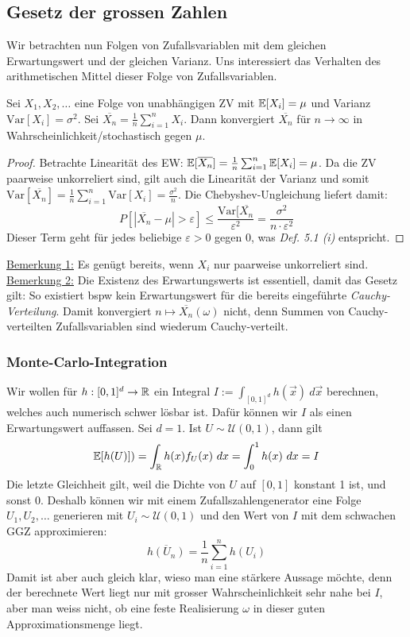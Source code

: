 \subsection{Gesetz der grossen Zahlen}
Wir betrachten nun Folgen von Zufallsvariablen mit dem gleichen Erwartungswert und der gleichen Varianz. Uns interessiert das Verhalten des arithmetischen Mittel dieser Folge von Zufallsvariablen.
\begin{satz}
Sei $X_1, X_2, \dots$ eine Folge von unabhängigen ZV mit $\mathbb{E}[X_i]= \mu $ und Varianz $\mathrm{Var}[X_i] = \sigma^2$. Sei $\overline{X_n} =\frac{1}{n}\sum_{i=1}^n X_i$. Dann konvergiert $\overline{X_n}$ für $n\to \infty$ in Wahrscheinlichkeit/stochastisch gegen $\mu$.
\end{satz}
\begin{proof}
Betrachte Linearität des EW: $\mathbb{E}[\overline{X_n}] = \frac{1}{n}\sum_{i=1}^n \mathbb{E}[X_i] = \mu$. Da die ZV paarweise unkorreliert sind, gilt auch die Linearität der Varianz und somit $\mathrm{Var}[\overline{X_n}] = \frac{1}{n}\sum_{i=1}^n \mathrm{Var}[X_i] = \frac{\sigma^2}{n}$. Die Chebyshev-Ungleichung liefert damit:
$$ P \left[ |\overline{X_n}-\mu|> \varepsilon \right] \leq \frac{\mathrm{Var}[\overline{X_n}}{\varepsilon^2} = \frac{\sigma^2}{n\cdot \varepsilon^2}$$
Dieser Term geht für jedes beliebige $\varepsilon>0$ gegen 0, was \textit{Def. 5.1 (i)} entspricht.
\end{proof}
\underline{Bemerkung 1:} Es genügt bereits, wenn $X_i$ nur paarweise unkorreliert sind.\\
\underline{Bemerkung 2:} Die Existenz des Erwartungswerts ist essentiell, damit das Gesetz gilt: So existiert bspw kein Erwartungswert für die bereits eingeführte \textit{Cauchy-Verteilung}. Damit konvergiert $n\mapsto \overline{X_n}(\omega)$ nicht, denn Summen von Cauchy-verteilten Zufallsvariablen sind wiederum Cauchy-verteilt.

\subsubsection*{Monte-Carlo-Integration}
Wir wollen für $h:[0,1]^d \to \mathbb{R}$ ein Integral $I:= \int_{[0,1]^d} h(\vec{x}) \ d\vec{x}$ berechnen, welches auch numerisch schwer lösbar ist. Dafür können wir $I$ als einen Erwartungswert auffassen. Sei $d=1$. Ist $U \sim \mathcal{U}(0,1)$, dann gilt 
$$ \mathbb{E}[h(U)] ) = \int_{\mathbb{R}} h(x)f_U(x) \ dx = \int_0^1 h(x) \ dx = I$$
Die letzte Gleichheit gilt, weil die Dichte von $U$ auf $[0,1]$ konstant 1 ist, und sonst 0. Deshalb können wir mit einem Zufallszahlengenerator eine Folge $U_1,U_2,\dots$ generieren mit $U_i \sim \mathcal{U}(0,1)$ und den Wert von $I$ mit dem schwachen GGZ approximieren:
$$ \overline{h(U_n)} = \frac{1}{n} \sum_{i=1}^n h(U_i)$$ 
Damit ist aber auch gleich klar, wieso man eine stärkere Aussage möchte, denn der berechnete Wert liegt nur mit grosser Wahrscheinlichkeit sehr nahe bei $I$, aber man weiss nicht, ob eine feste Realisierung $\omega$ in dieser guten Approximationsmenge liegt.

